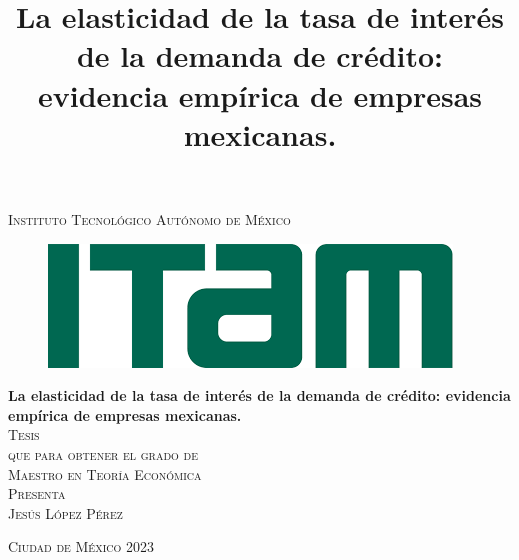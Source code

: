 \documentclass[11pt, oneside]{book}
\begin{document}

\title{La elasticidad de la tasa de interés de la demanda de crédito: evidencia empírica de empresas mexicanas.} %

\begin{titlepage}
\begin{center}

\textsc{\Large Instituto Tecnológico Autónomo de México}\\[2em]

\begin{figure}[h]
\begin{center}
\includegraphics[scale=0.50]{itam_logo.png}
\end{center}
\end{figure}


\textbf{\LARGE La elasticidad de la tasa de interés de la demanda de crédito: evidencia empírica de empresas mexicanas.}\\[2em]

\textsc{\large Tesis}\\[1em]

\textsc{\large que para obtener el grado de}\\[1em]

\textsc{\LARGE Maestro en Teoría Económica }\\[1em]

\textsc{\large Presenta}\\[1em]

\textsc{\LARGE Jesús López Pérez}\\[1em]


\end{center}

\vspace*{\fill}
\textsc{Ciudad de México \hspace*{\fill} 2023}

\end{titlepage}
\end{document}
